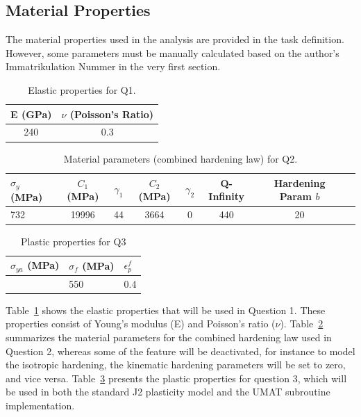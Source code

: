 \documentclass[12pt]{article}
\begin{document}
\subsection{Material Properties}
\hspace*{2em}The material properties used in the analysis are provided in the task definition. However, 
some parameters must be manually calculated based on the author's Immatrikulation Nummer in the very first section.

\begin{table}[H]
    \centering
    \caption{Elastic properties for Q1.}
    \label{tab:materialQ1-properties}
    \begin{tabular}{ll}
        \toprule
        E (GPa) & $\nu$ (Poisson's Ratio) \\
        \midrule
        \multicolumn{1}{c}{240} & \multicolumn{1}{c}{0.3} \\
        \bottomrule
    \end{tabular}
\end{table}

\begin{table}[H]
    \centering
    \caption{Material parameters (combined hardening law) for Q2.}
    \label{tab:materialQ2-properties}
    \begin{tabular}{lccccccc}
        \toprule
        $\sigma_y$ (MPa) & $C_1$ (MPa) & $\gamma_1$ & $C_2$ (MPa) & $\gamma_2$ & Q-Infinity & Hardening Param $b$ \\
        \midrule
        732 & 19996 & 44 & 3664 & 0 & 440 & 20 \\
        \bottomrule
    \end{tabular}
\end{table}

\begin{table}[H]
    \centering
    \caption{Plastic properties for Q3}
    \label{tab:materialQ3-properties}
    \begin{tabular}{lll}
        \toprule
            \centering $\sigma_{ya}$ (MPa) & $\sigma_f$ (MPa) & $\epsilon_{p}^f$  \\
            \midrule
            \centering 360 & 550 & 0.4  \\
            \bottomrule
    \end{tabular}
\end{table}
\vspace{1em}
\hspace{2em}Table~\ref{tab:materialQ1-properties} shows the elastic properties that will be used in Question 1. These properties
consist of Young's modulus (E) and Poisson's ratio ($\nu$). 
Table~\ref{tab:materialQ2-properties} summarizes the material parameters for the combined hardening law 
used in Question 2, whereas some of the feature will be deactivated, for instance to model the isotropic
hardening, the kinematic hardening parameters will be set to zero, and vice versa. Table~\ref{tab:materialQ3-properties}
presents the plastic properties for question 3, which will be used in both
the standard J2 plasticity model and the UMAT subroutine implementation.
\end{document}

